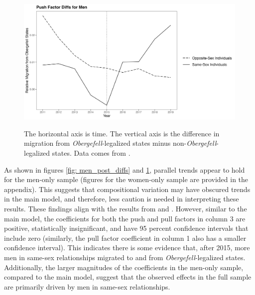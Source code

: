 \documentclass[12pt,letterpaper]{article}
\begin{document}
\begin{figure}[htbp]
    \centering
    \caption{}
    \label{fig: men_ante_diffs}
    \includegraphics[width=.75\linewidth]{outputs/summary_stats/men_ante_diffs.png}

    \vspace{0.5em}
    \begin{minipage}{0.75\linewidth}
        \footnotesize The horizontal axis is time. The vertical axis is the difference in migration from \textit{Obergefell}-legalized states minus non-\textit{Obergefell}-legalized states. Data comes from \citet{28}.
    \end{minipage}
\end{figure}

As shown in figures \ref{fig: men_post_diffs} and \ref{fig: men_ante_diffs}, parallel trends appear to hold for the men-only sample (figures for the women-only sample are provided in the appendix). This suggests that compositional variation may have obscured trends in the main model, and therefore, less caution is needed in interpreting these results. These findings align with the results from \citet{1} and \citet{12}. However, similar to the main model, the coefficients for both the push and pull factors in column 3 are positive, statistically insignificant, and have 95 percent confidence intervals that include zero (similarly, the pull factor coefficient in column 1 also has a smaller confidence interval). This indicates there is some evidence that, after 2015, more men in same-sex relationships migrated to and from \textit{Obergefell}-legalized states. Additionally, the larger magnitudes of the coefficients in the men-only sample, compared to the main model, suggest that the observed effects in the full sample are primarily driven by men in same-sex relationships.
\end{document}
